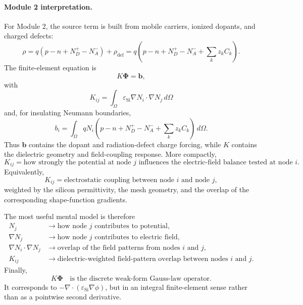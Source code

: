 \documentclass[11pt]{article}
\begin{document}
\paragraph{Module 2 interpretation.}
For Module 2, the source term is built from mobile carriers, ionized dopants, and charged defects:
\begin{equation}
\rho
= q\left(p-n+N_D^+-N_A^-\right)+\rho_{\mathrm{def}}
= q\left(p-n+N_D^+-N_A^-+\sum_k z_k C_k\right).
\end{equation}
The finite-element equation is
\begin{equation}
K\bm{\Phi}=\bm{b},
\end{equation}
with
\begin{equation}
K_{ij}
= \int_{\Omega}\varepsilon_{\mathrm{Si}}\nabla N_i\cdot\nabla N_j\,d\Omega
\end{equation}
and, for insulating Neumann boundaries,
\begin{equation}
b_i=\int_{\Omega}qN_i
\left(p-n+N_D^+-N_A^-+\sum_k z_k C_k\right)\,d\Omega.
\end{equation}
Thus $\bm{b}$ contains the dopant and radiation-defect charge forcing, while $K$ contains the dielectric geometry and field-coupling response. More compactly,
\begin{equation}
\boxed{
K_{ij}
= \text{how strongly the potential at node } j
\text{ influences the electric-field balance tested at node } i.
}
\end{equation}
Equivalently,
\begin{equation}
\boxed{
K_{ij}
= \text{electrostatic coupling between node } i
\text{ and node } j,
}
\end{equation}
weighted by the silicon permittivity, the mesh geometry, and the overlap of the corresponding shape-function gradients.

The most useful mental model is therefore
\begin{align}
N_j
&\longrightarrow \text{how node }j\text{ contributes to potential}, \\
\nabla N_j
&\longrightarrow \text{how node }j\text{ contributes to electric field}, \\
\nabla N_i\cdot\nabla N_j
&\longrightarrow \text{overlap of the field patterns from nodes }i\text{ and }j, \\
K_{ij}
&\longrightarrow \text{dielectric-weighted field-pattern overlap between nodes }i\text{ and }j.
\end{align}
Finally,
\begin{equation}
\boxed{
K\bm{\Phi}\quad\text{is the discrete weak-form Gauss-law operator.}
}
\end{equation}
It corresponds to $-\nabla\cdot(\varepsilon_{\mathrm{Si}}\nabla\phi)$, but in an integral finite-element sense rather than as a pointwise second derivative.
\end{document}
